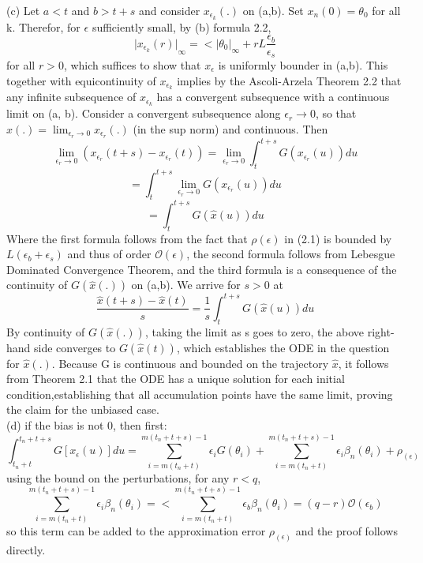 \documentclass{article}
\begin{document}
(c) Let $a<t$ and $b>t+s$ and consider $x_{\epsilon_k}(.)$ on (a,b). Set $x_n(0)=\theta_0$ for all k. Therefor, for $\epsilon$ sufficiently small, by (b) formula 2.2,
$$ {\lvert x_{\epsilon_k}(r) \rvert}_\infty =< {\lvert \theta_0 \rvert}_\infty + rL\frac{\epsilon_b}{\epsilon_s} $$
for all $r>0$, which suffices to show that $x_\epsilon$ is uniformly bounder in (a,b). This together with equicontinuity of $x_{\epsilon_k}$ implies by the Ascoli-Arzela Theorem 2.2 that any infinite subsequence of $x_{\epsilon_k}$ has a convergent subsequence with a continuous limit on (a, b). Consider a convergent subsequence along $\epsilon_r \rightarrow 0$, so that $\hat{x}(.)=\lim_{\epsilon_r \rightarrow 0}x_{\epsilon_r}(.)$ (in the sup norm)  and continuous. Then 
$$ \lim_{\epsilon_r \rightarrow 0}(x_{\epsilon_r}(t+s)-x_{\epsilon_r}(t))=\lim_{\epsilon_r \rightarrow 0}\int_{t}^{t+s}G(x_{\epsilon_r}(u))du $$
$$ =\int_{t}^{t+s}\lim_{\epsilon_r \rightarrow 0}G(x_{\epsilon_r}(u))du $$
$$ =\int_{t}^{t+s}G(\hat{x}(u))du $$
Where the first formula follows from the fact that $\rho(\epsilon)$ in (2.1) is bounded by $L(\epsilon_b+\epsilon_s)$ and thus of order $\mathcal{O}(\epsilon)$, the second formula follows from Lebesgue Dominated Convergence Theorem, and the third formula is a consequence
of the continuity of $G(\hat{x}(.))$ on (a,b). We arrive for $s>0$ at
$$ \frac{\hat{x}(t+s)-\hat{x}(t)}{s}=\frac{1}{s}\int_{t}^{t+s}G(\hat{x}(u))du $$
By continuity of $G(\hat{x}(.))$, taking the limit as s goes to zero, the above right-hand side converges to $G(\hat{x}(t))$, which establishes the ODE in the question for $\hat{x}(.)$. Because G is continuous and bounded on the trajectory $\hat{x}$,  it follows from Theorem 2.1 that the ODE has a unique solution for each initial condition,establishing that all accumulation points have the same limit, proving the claim for the unbiased
case. \\


(d) if the bias is not 0, then first:
$$ \int_{t_n+t}^{t_n+t+s}G[x_\epsilon(u)]du=\sum_{i=m(t_n+t)}^{m(t_n+t+s)-1}\epsilon_iG(\theta_i)+\sum_{i=m(t_n+t)}^{m(t_n+t+s)-1}\epsilon_i\beta_n(\theta_i)+\rho_(\epsilon) $$
using the bound on the perturbations, for any $r<q$, 
$$ \sum_{i=m(t_n+t)}^{m(t_n+t+s)-1}\epsilon_i\beta_n(\theta_i)=<\sum_{i=m(t_n+t)}^{m(t_n+t+s)-1}\epsilon_b\beta_n(\theta_i)=(q-r)\mathcal{O}(\epsilon_b) $$
so this term can be added to the approximation error $\rho_(\epsilon)$ and the proof follows directly.
\end{document}
